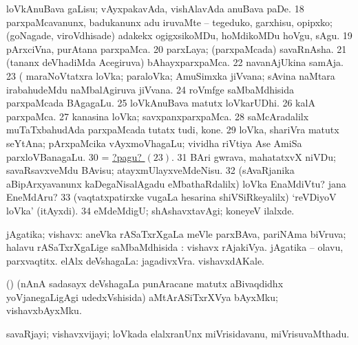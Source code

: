  loVkAnuBava gaLisu; vAyxpakavAda, vishAlavAda anuBava paDe. 
\eanum
\numie
\num{18}  parxpaMcavanunx, badukanunx adu iruvaMte -- tegeduko, garxhisu, opipxko; (goNagade, viroVdhisade) adakekx ogigxsikoMDu, hoMdikoMDu hoVgu, sAgu. 
\num{19}  pArxciVna, purAtana parxpaMca. 
\num{20}  parxLaya; (parxpaMcada) savaRnAsha. 
\num{21}  (tananx deVhadiMda Acegiruva) bAhayxparxpaMca. 
\num{22}  navanAjUkina samAja. 
\hypertarget{world pagu23}{} 
\num{23}  (  maraNoVtatxra loVka; paraloVka; AmuSimxka jiVvana; sAvina naMtara irabahudeMdu naMbalAgiruva jiVvana. 
\num{24}  roVmfge saMbaMdhisida parxpaMcada BAgagaLu. 
\num{25}  loVkAnuBava matutx loVkarUDhi. 
\num{26}  kalA parxpaMca. 
\num{27}  kanasina loVka; savxpanxparxpaMca. 
\num{28}  saMcAradalilx muTaTxbahudAda parxpaMcada tutatx tudi, kone. 
\num{29}  loVka, shariVra matutx seYtAna; pArxpaMcika vAyxmoVhagaLu; vividha riVtiya Ase AmiSa parxloVBanagaLu. 
\num{30}  = \hyperlink{world pagu23}{?pagu? \((23)\)}. 
\num{31}  BAri gwrava, mahatatxvX niVDu; savaRsavxveMdu BAvisu; atayxmUlayxveMdeNisu. 
\num{32}  (sAvaRjanika aBipArxyavanunx kaDegaNisalAgadu eMbathaRdalilx) loVka EnaMdiVtu? jana EneMdAru? 
\num{33}  (vaqtatxpatirxke \mo vugaLa hesarina shiVSiRkeyalilx) `reVDiyoV loVka' (itAyxdi). 
\num{34}  eMdeMdigU; shAshavxtavAgi; koneyeV ilalxde. 
\enum
\emng
\eentry

\bentry
{} 
\gl{\gu}
\expl{}
\bmng
jAgatika; vishavx: 
\banum
{} aneVka rASaTxrXgaLa meVle parxBAva, pariNAma biVruva; halavu rASaTxrXgaLige saMbaMdhisida :  vishavx rAjakiVya.  jAgatika -- olavu, parxvaqtitx. 
 elAlx deVshagaLa:  jagadivxVra.  vishavxdAKale. 
\eanum
\emng
\eentry

\bentry
{} 
\gl{\nA}
\expl{}
\bmng
(\AmA) (nAnA sadasayx deVshagaLa punAracane matutx aBivaqdidhx yoVjanegaLigAgi udedxVshisida) aMtArASiTxrXVya bAyxMku; vishavxbAyxMku. 
\emng
\eentry

\bentry
{} 
\gl{\nA}
\expl{}
\bmng
savaRjayi; vishavxvijayi; loVkada elalxranUnx miVrisidavanu, miVrisuvaMthadu. 
\emng
\eentry

